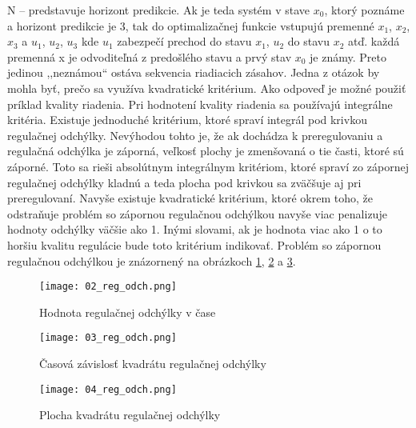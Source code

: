 N – predstavuje horizont predikcie. Ak je teda systém v stave $x_0$, ktorý poznáme a horizont predikcie je 3, tak do optimalizačnej funkcie vstupujú premenné $x_1$, $x_2$, $x_3$ a $u_1$, $u_2$, $u_3$ kde $u_1$ zabezpečí prechod do stavu $x_1$, $u_2$ do stavu $x_2$ atď. každá premenná x je odvoditeľná z predošlého stavu a prvý stav $x_0$ je známy. Preto jedinou ,,neznámou`` ostáva sekvencia riadiacich zásahov. Jedna z otázok by mohla byť, prečo sa využíva kvadratické kritérium. Ako odpoveď je možné použiť príklad kvality riadenia. Pri hodnotení kvality riadenia sa používajú integrálne kritéria. Existuje jednoduché kritérium, ktoré spraví integrál pod krivkou regulačnej odchýlky. Nevýhodou tohto je, že ak dochádza k preregulovaniu a regulačná odchýlka je záporná, veľkosť plochy je zmenšovaná o tie časti, ktoré sú záporné. Toto sa rieši absolútnym integrálnym kritériom, ktoré spraví zo zápornej regulačnej odchýlky kladnú a teda plocha pod krivkou sa zväčšuje aj pri preregulovaní. Navyše existuje kvadratické kritérium, ktoré okrem toho, že odstraňuje problém so zápornou regulačnou odchýlkou navyše viac penalizuje hodnoty odchýlky väčšie ako 1. Inými slovami, ak je hodnota viac ako 1 o to horšiu kvalitu regulácie bude toto kritérium indikovať. Problém so zápornou regulačnou odchýlkou je znázornený na obrázkoch \ref{02_reg_odch}, \ref{03_reg_odch} a \ref{04_reg_odch}.
\begin{figure}[h]
\centering
\texttt{[image: 02\_reg\_odch.png]}
\caption{Hodnota regulačnej odchýlky v čase}
\label{02_reg_odch}
\end{figure}

\begin{figure}[h]
\centering
\texttt{[image: 03\_reg\_odch.png]}
\caption{Časová závislosť kvadrátu regulačnej odchýlky}
\label{03_reg_odch}
\end{figure}
\begin{figure}[h]
\centering
\texttt{[image: 04\_reg\_odch.png]}
\caption{Plocha kvadrátu regulačnej odchýlky}
\label{04_reg_odch}
\end{figure}

